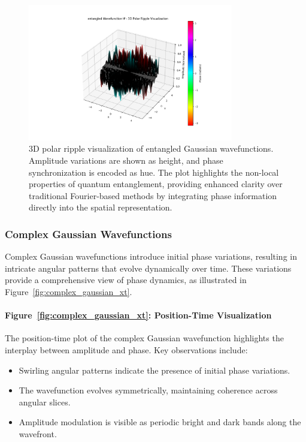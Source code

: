 \documentclass[12pt]{article}
\begin{document}
\begin{figure}[H]
\centering
\includegraphics[width=0.8\textwidth]{images/entangled_wavefunction_3d_polar_probability_density_with_phase.png}
\caption{3D polar ripple visualization of entangled Gaussian wavefunctions. Amplitude variations are shown as height, and phase synchronization is encoded as hue. The plot highlights the non-local properties of quantum entanglement, providing enhanced clarity over traditional Fourier-based methods by integrating phase information directly into the spatial representation.}
\label{fig:entangled_3d_polar}
\end{figure}

\subsubsection{Complex Gaussian Wavefunctions}
Complex Gaussian wavefunctions introduce initial phase variations, resulting in intricate angular patterns that evolve dynamically over time. These variations provide a comprehensive view of phase dynamics, as illustrated in Figure~\ref{fig:complex_gaussian_xt}.

\paragraph{Figure~\ref{fig:complex_gaussian_xt}: Position-Time Visualization}
The position-time plot of the complex Gaussian wavefunction highlights the interplay between amplitude and phase. Key observations include:
\begin{itemize}
    \item Swirling angular patterns indicate the presence of initial phase variations.
    \item The wavefunction evolves symmetrically, maintaining coherence across angular slices.
    \item Amplitude modulation is visible as periodic bright and dark bands along the wavefront.
\end{itemize}
\end{document}
